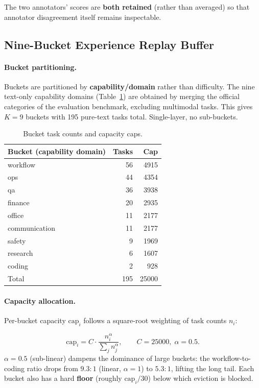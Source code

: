 The two annotators' scores are \textbf{both retained} (rather than averaged) so that annotator disagreement itself remains inspectable.

\subsection{Nine-Bucket Experience Replay Buffer}
\label{sec:buffer}

\paragraph{Bucket partitioning.} Buckets are partitioned by \textbf{capability/domain} rather than difficulty. The nine text-only capability domains (Table~\ref{tab:buckets}) are obtained by merging the official categories of the evaluation benchmark, excluding multimodal tasks. This gives $K=9$ buckets with 195 pure-text tasks total. Single-layer, no sub-buckets.

\begin{table}[t]
\centering
\caption{Bucket task counts and capacity caps.}
\label{tab:buckets}
\begin{tabular}{lrr}
\toprule
Bucket (capability domain) & Tasks & Cap \\
\midrule
workflow & 56 & 4915 \\
ops & 44 & 4354 \\
qa & 36 & 3938 \\
finance & 20 & 2935 \\
office & 11 & 2177 \\
communication & 11 & 2177 \\
safety & 9 & 1969 \\
research & 6 & 1607 \\
coding & 2 & 928 \\
\midrule
Total & 195 & 25000 \\
\bottomrule
\end{tabular}
\end{table}

\paragraph{Capacity allocation.} Per-bucket capacity $\text{cap}_i$ follows a square-root weighting of task counts $n_i$:

\begin{equation}
  \text{cap}_i = C\cdot\frac{n_i^{\alpha}}{\sum_j n_j^{\alpha}},\qquad C=25000,\;\alpha=0.5.
  \label{eq:quota}
\end{equation}
$\alpha=0.5$ (sub-linear) dampens the dominance of large buckets: the workflow-to-coding ratio drops from $9.3\!:\!1$ (linear, $\alpha=1$) to $5.3\!:\!1$, lifting the long tail. Each bucket also has a hard \textbf{floor} (roughly $\text{cap}_i/30$) below which eviction is blocked.

